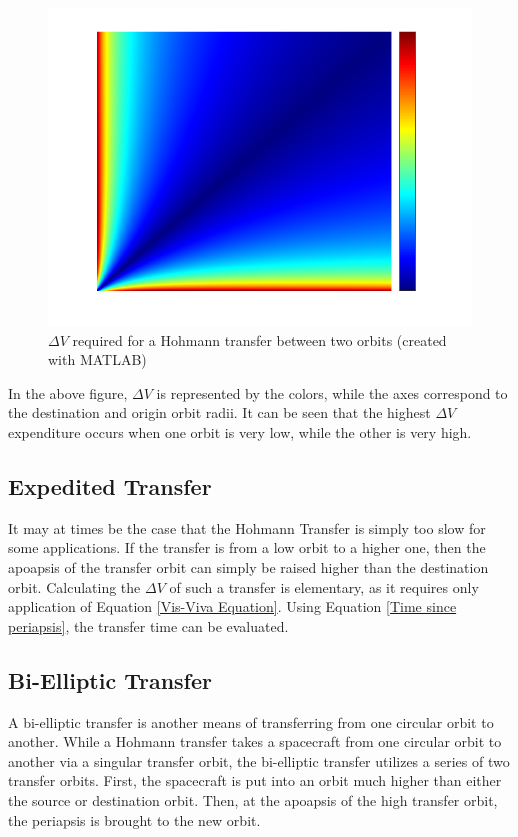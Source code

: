 \documentclass{article}
\begin{document}
\begin{figure}[H]
    \centering
    \includegraphics[scale=0.5]{DeltaVHeatmap.png}
    \caption{$\Delta V$ required for a Hohmann transfer between two orbits (created with MATLAB)}\label{fig:Delta V Heatmap}
\end{figure}

In the above figure, $\Delta V$ is represented by the colors, while the axes correspond to the destination and origin orbit radii. It can be seen that the highest $\Delta V$ expenditure occurs when one orbit is very low, while the other is very high.

\bigskip\bigskip
\subsection{Expedited Transfer}

It may at times be the case that the Hohmann Transfer is simply too slow for some applications. If the transfer is from a low orbit to a higher one, then the apoapsis of the transfer orbit can simply be raised higher than the destination orbit. Calculating the $\Delta V$ of such a transfer is elementary, as it requires only application of Equation \eqref{Vis-Viva Equation}. Using Equation \eqref{Time since periapsis}, the transfer time can be evaluated.

\bigskip\bigskip
\subsection{Bi-Elliptic Transfer}

A bi-elliptic transfer is another means of transferring from one circular orbit to another. While a Hohmann transfer takes a spacecraft from one circular orbit to another via a singular transfer orbit, the bi-elliptic transfer utilizes a series of two transfer orbits. First, the spacecraft is put into an orbit much higher than either the source or destination orbit. Then, at the apoapsis of the high transfer orbit, the periapsis is brought to the new orbit.
\end{document}
